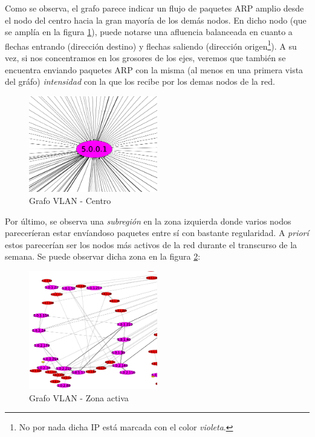     \par Como se observa, el grafo parece indicar un flujo de paquetes ARP amplio desde
    el nodo del centro hacia la gran mayor\'ia de los dem\'as nodos. En dicho nodo (que se
    ampl\'ia en la figura \ref{fig:vlan10_grafo_centro}), puede notarse una afluencia
    balanceada en cuanto a flechas entrando (direcci\'on destino) y flechas saliendo
    (direcci\'on origen\footnote{No por nada dicha IP est\'a marcada con el color
    \textit{violeta}.}). A su vez, si nos concentramos en los grosores de los ejes,
    veremos que tambi\'en se encuentra enviando paquetes ARP con la misma (al menos
    en una primera vista del gr\'afo) \textit{intensidad} con la que los recibe
    por los demas nodos de la red.

    \begin{figure}
        \centering
        \includegraphics[width=0.5\textwidth]{img/graph/escenario_1/vlan10/vlan10_500toEnd_centro}
        \caption{Grafo VLAN  - Centro}
        \label{fig:vlan10_grafo_centro}
    \end{figure}

    \par Por \'ultimo, se observa una \textit{subregi\'on} en la zona izquierda donde varios
    nodos parecer\'ieran estar env\'iandoso paquetes entre s\'i con bastante regularidad. A
    \textit{prior\'i} estos parecer\'ian ser los nodos m\'as activos de la red durante el
    transcurso de la semana. Se puede observar dicha zona en la figura \ref{fig:vlan10_grafo_inf}:

    \begin{figure}
        \centering
        \includegraphics[width=0.5\textwidth]{img/graph/escenario_1/vlan10/vlan10_500toEnd_inf}
        \caption{Grafo VLAN  - Zona activa}
        \label{fig:vlan10_grafo_inf}
    \end{figure}

